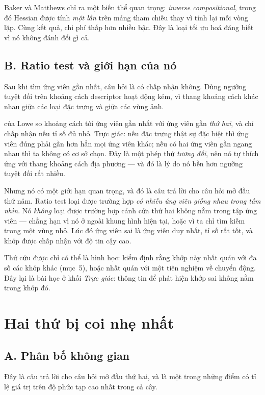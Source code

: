 \documentclass[../../vslam.tex]{subfiles}
\begin{document}
Baker và Matthews \cite{baker2004lk} chỉ ra một biến thể quan trọng: \emph{inverse compositional}, trong đó Hessian được tính \emph{một lần} trên mảng tham chiếu thay vì tính lại mỗi vòng lặp. Cùng kết quả, chi phí thấp hơn nhiều bậc. Đây là loại tối ưu hoá đáng biết vì nó không đánh đổi gì cả.

\subsection{B. Ratio test và giới hạn của nó}

Sau khi tìm ứng viên gần nhất, câu hỏi là có chấp nhận không. Dùng ngưỡng tuyệt đối trên khoảng cách descriptor hoạt động kém, vì thang khoảng cách khác nhau giữa các loại đặc trưng và giữa các vùng ảnh.

 của Lowe so khoảng cách tới ứng viên gần nhất với ứng viên gần \emph{thứ hai}, và chỉ chấp nhận nếu tỉ số đủ nhỏ. Trực giác: nếu đặc trưng thật sự đặc biệt thì ứng viên đúng phải gần hơn hẳn mọi ứng viên khác; nếu có hai ứng viên gần ngang nhau thì ta không có cơ sở chọn. Đây là một phép thử \emph{tương đối}, nên nó tự thích ứng với thang khoảng cách địa phương --- và đó là lý do nó bền hơn ngưỡng tuyệt đối rất nhiều.

Nhưng nó có một giới hạn quan trọng, và đó là câu trả lời cho câu hỏi mở đầu thứ năm. Ratio test loại được trường hợp \emph{có nhiều ứng viên giống nhau trong tầm nhìn}. Nó \emph{không} loại được trường hợp cánh cửa thứ hai không nằm trong tập ứng viên --- chẳng hạn vì nó ở ngoài khung hình hiện tại, hoặc vì ta chỉ tìm kiếm trong một vùng nhỏ. Lúc đó ứng viên sai là ứng viên duy nhất, tỉ số rất tốt, và khớp được chấp nhận với độ tin cậy cao.

Thứ cứu được chỉ có thể là hình học: kiểm định rằng khớp này nhất quán với đa số các khớp khác (mục~5), hoặc nhất quán với một tiên nghiệm về chuyển động. Đây lại là bài học ở khối \emph{Trực giác}: thông tin để phát hiện khớp sai không nằm trong khớp đó.

\section{Hai thứ bị coi nhẹ nhất}

\subsection{A. Phân bố không gian}

Đây là câu trả lời cho câu hỏi mở đầu thứ hai, và là một trong những điểm có tỉ lệ giá trị trên độ phức tạp cao nhất trong cả cây.
\end{document}
